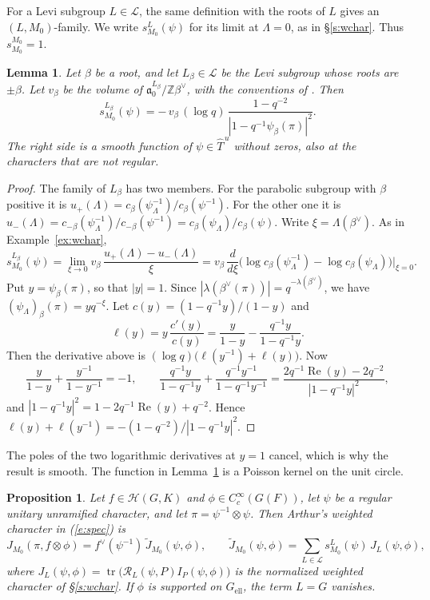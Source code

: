 \documentclass[12pt,letterpaper]{article}
\numberwithin{equation}{section}
\theoremstyle{plain}
\newtheorem{proposition}[theorem]{Proposition}
\newtheorem{lemma}[theorem]{Lemma}
\theoremstyle{definition}
\theoremstyle{remark}
\newcommand{\Hc}{\mathcal{H}}
\newcommand{\cL}{\mathcal{L}}
\newcommand{\fa}{\mathfrak{a}}
\newcommand{\Thu}{\widehat{T}^{\,u}}
\DeclareMathOperator{\tr}{tr}
\newcommand{\ellr}{\mathrm{ell}}
\begin{document}
For a Levi subgroup $L\in\cL$, the same definition with the roots of $L$ gives an $(L,M_0)$-family. We write $s^L_{M_0}(\psi)$ for its limit at $\Lambda=0$, as in \S\ref{s:wchar}. Thus $s^{M_0}_{M_0}=1$.

\begin{lemma}\label{l:sbeta}
Let $\beta$ be a root, and let $L_\beta\in\cL$ be the Levi subgroup whose roots are $\pm\beta$. Let $v_\beta$ be the volume of $\fa_0^{L_\beta}/\mathbb{Z}\beta^\vee$, with the conventions of \cite[Example~2.5]{JC26}. Then
\[
s^{L_\beta}_{M_0}(\psi)=-\,v_\beta\,(\log q)\,\frac{1-q^{-2}}{|1-q^{-1}\psi_\beta(\pi)|^2}.
\]
The right side is a smooth function of $\psi\in\Thu$ without zeros, also at the characters that are not regular.
\end{lemma}

\begin{proof}
The family of $L_\beta$ has two members. For the parabolic subgroup with $\beta$ positive it is $u_+(\Lambda)=c_\beta(\psi_\Lambda^{-1})/c_\beta(\psi^{-1})$. For the other one it is $u_-(\Lambda)=c_{-\beta}(\psi_\Lambda^{-1})/c_{-\beta}(\psi^{-1})=c_\beta(\psi_\Lambda)/c_\beta(\psi)$. Write $\xi=\Lambda(\beta^\vee)$. As in Example~\ref{ex:wchar},
\[
s^{L_\beta}_{M_0}(\psi)=\lim_{\xi\to0}v_\beta\,\frac{u_+(\Lambda)-u_-(\Lambda)}{\xi}=v_\beta\,\frac{d}{d\xi}\Big(\log c_\beta(\psi_\Lambda^{-1})-\log c_\beta(\psi_\Lambda)\Big)\Big|_{\xi=0}.
\]
Put $y=\psi_\beta(\pi)$, so that $|y|=1$. Since $|\lambda(\beta^\vee(\pi))|=q^{-\lambda(\beta^\vee)}$, we have $(\psi_\Lambda)_\beta(\pi)=yq^{-\xi}$. Let $c(y)=(1-q^{-1}y)/(1-y)$ and
\[
\ell(y)=y\,\frac{c'(y)}{c(y)}=\frac{y}{1-y}-\frac{q^{-1}y}{1-q^{-1}y}.
\]
Then the derivative above is $(\log q)\big(\ell(y^{-1})+\ell(y)\big)$. Now
\[
\frac{y}{1-y}+\frac{y^{-1}}{1-y^{-1}}=-1,\qquad \frac{q^{-1}y}{1-q^{-1}y}+\frac{q^{-1}y^{-1}}{1-q^{-1}y^{-1}}=\frac{2q^{-1}\operatorname{Re}(y)-2q^{-2}}{|1-q^{-1}y|^2},
\]
and $|1-q^{-1}y|^2=1-2q^{-1}\operatorname{Re}(y)+q^{-2}$. Hence $\ell(y)+\ell(y^{-1})=-(1-q^{-2})/|1-q^{-1}y|^2$.
\end{proof}

The poles of the two logarithmic derivatives at $y=1$ cancel, which is why the result is smooth. The function in Lemma~\ref{l:sbeta} is a Poisson kernel on the unit circle.

\begin{proposition}\label{p:density}
Let $f\in\Hc(G,K)$ and $\phi\in C_c^\infty(G(F))$, let $\psi$ be a regular unitary unramified character, and let $\pi=\psi^{-1}\otimes\psi$. Then Arthur's weighted character in (\ref{e:spec}) is
\[
J_{M_0}(\pi,f\otimes\phi)=f^\vee(\psi^{-1})\,\widetilde J_{M_0}(\psi,\phi),\qquad\widetilde J_{M_0}(\psi,\phi)=\sum_{L\in\cL}s^L_{M_0}(\psi)\,J_L(\psi,\phi),
\]
where $J_L(\psi,\phi)=\tr\big(\mathcal R_L(\psi,P)I_P(\psi,\phi)\big)$ is the normalized weighted character of \S\ref{s:wchar}. If $\phi$ is supported on $G_{\ellr}$, the term $L=G$ vanishes.
\end{proposition}
\end{document}
